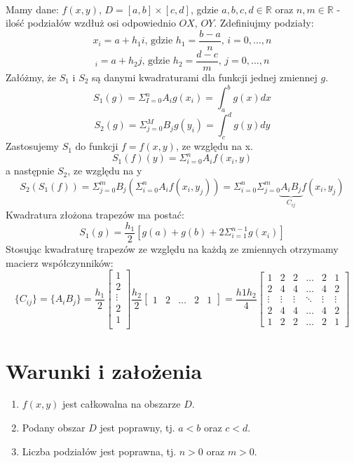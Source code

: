 \documentclass{article}
\begin{document}
\paragraph{}
Mamy dane: $f(x,y)$, $D = [a,b]\times[c,d]$, gdzie $a,b,c,d\in\mathbb{R}$ oraz $n,m\in\mathbb{R}$ - ilość podziałów wzdłuż osi odpowiednio $OX$, $OY$. Zdefiniujmy podziały:
$$x_i=a+h_1i\text{, gdzie }h_1=\dfrac{b-a}{n}\text{, }i=0,\dots,n$$
$$_i=a+h_2j\text{, gdzie }h_2=\dfrac{d-c}{m}\text{, }j=0,\dots,n$$
Załóżmy, że $S_1$ i $S_2$ są danymi kwadraturami dla funkcji jednej zmiennej $g$.\\
$$S_1(g) = \Sigma_{I=0}^{n}A_ig(x_i)=\int_a^bg(x)dx$$
$$S_2(g) = \Sigma_{j=0}^{M}B_jg(y_i)=\int_c^dg(y)dy$$
Zastosujemy $S_1$ do funkcji $f=f(x,y)$, ze względu na x.
$$S_1(f)(y)=\Sigma_{i=0}^nA_if(x_i,y)$$
a następnie $S_2$, ze względu na y
$$S_2(S_1(f))=\Sigma_{j=0}^mB_j(\Sigma_{i=0}^nA_if(x_i,y_j))=\Sigma_{i=0}^n\Sigma_{j=0}^m\underbrace{A_iB_j}_{C_{ij}}f(x_i,y_j)$$
Kwadratura złożona trapezów ma postać:
$$S_1(g)=\frac{h_1}{2}[g(a)+g(b)+2\Sigma_{i=1}^{n-1}g(x_i)]$$
Stosując kwadraturę trapezów ze względu na każdą ze zmiennych otrzymamy macierz współczynników:
$$\{C_{ij}\}=\{A_iB_j\}=\frac{h_1}{2}
\begin{bmatrix}
1\\
2\\
\vdots\\
2\\
1\\
\end{bmatrix}
\frac{h_2}{2}
\begin{bmatrix}
1 & 2 & \dots & 2 & 1
\end{bmatrix}=\frac{h1h_2}{4}
\begin{bmatrix}
1 & 2 & 2 & \dots & 2 & 1\\
2 & 4 & 4 & \dots & 4 & 2\\
\vdots & \vdots & \vdots & \ddots & \vdots & \vdots\\
2 & 4 & 4 & \dots & 4 & 2\\
1 & 2 & 2 & \dots & 2 & 1
\end{bmatrix}$$
\section{Warunki i założenia}
\begin{enumerate}
\item $f(x,y)$ jest całkowalna na obszarze $D$.
\item Podany obszar $D$ jest poprawny, tj. $a<b$ oraz $c<d$.
\item Liczba podziałów jest poprawna, tj. $n >0$ oraz $m > 0$.
\end{enumerate}
\end{document}
